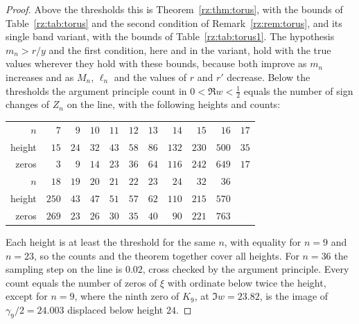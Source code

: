 \begin{proof}
Above the thresholds this is Theorem~\ref{rz:thm:torus}, with the bounds of Table~\ref{rz:tab:torus} and the second condition of Remark~\ref{rz:rem:torus}, and its single band variant, with the bounds of Table~\ref{rz:tab:torus1}. The hypothesis $m_n>r/y$ and the first condition, here and in the variant, hold with the true values wherever they hold with these bounds, because both improve as $m_n$ increases and as $M_n$, $\ell_n$ and the values of $r$ and $r'$ decrease. Below the thresholds the argument principle count in $0<\Re w<\frac12$ equals the number of sign changes of $Z_n$ on the line, with the following heights and counts:
\begin{center}
\small
\begin{tabular}{rrrrrrrrrrr}
\toprule
$n$ & $7$ & $9$ & $10$ & $11$ & $12$ & $13$ & $14$ & $15$ & $16$ & $17$\\
height & $15$ & $24$ & $32$ & $43$ & $58$ & $86$ & $132$ & $230$ & $500$ & $35$\\
zeros & $3$ & $9$ & $14$ & $23$ & $36$ & $64$ & $116$ & $242$ & $649$ & $17$\\
\midrule
$n$ & $18$ & $19$ & $20$ & $21$ & $22$ & $23$ & $24$ & $32$ & $36$ &\\
height & $250$ & $43$ & $47$ & $51$ & $57$ & $62$ & $110$ & $215$ & $570$ &\\
zeros & $269$ & $23$ & $26$ & $30$ & $35$ & $40$ & $90$ & $221$ & $763$ &\\
\bottomrule
\end{tabular}
\end{center}
Each height is at least the threshold for the same $n$, with equality for $n=9$ and $n=23$, so the counts and the theorem together cover all heights. For $n=36$ the sampling step on the line is $0.02$, cross checked by the argument principle. Every count equals the number of zeros of $\xi$ with ordinate below twice the height, except for $n=9$, where the ninth zero of $K_9$, at $\Im w=23.82$, is the image of $\gamma_9/2=24.003$ displaced below height $24$.
\end{proof}

